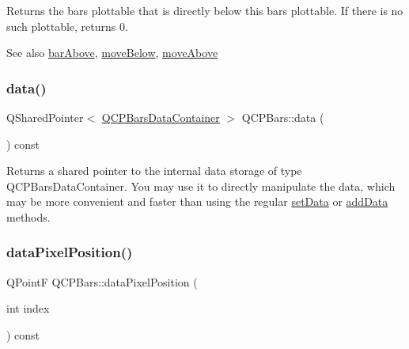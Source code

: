 Returns the bars plottable that is directly below this bars plottable. If there is no such plottable, returns 0.

\begin{DoxySeeAlso}{See also}
\hyperlink{class_q_c_p_bars_ab97f2acd9f6cb40d2cc3c33d278f0e78}{bar\+Above}, \hyperlink{class_q_c_p_bars_a69fc371346980f19177c3d1ecdad78ee}{move\+Below}, \hyperlink{class_q_c_p_bars_ac22e00a6a41509538c21b04f0a57318c}{move\+Above} 
\end{DoxySeeAlso}
\mbox{\label{class_q_c_p_bars_a7e373a534d82e18ed27b3fafd1f08fae}} 
\subsubsection{\texorpdfstring{data()}{data()}}
{\footnotesize\ttfamily Q\+Shared\+Pointer$<$ \hyperlink{class_q_c_p_data_container}{Q\+C\+P\+Bars\+Data\+Container} $>$ Q\+C\+P\+Bars\+::data (\begin{DoxyParamCaption}{ }\end{DoxyParamCaption}) const\hspace{0.3cm}{\ttfamily [inline]}}

Returns a shared pointer to the internal data storage of type Q\+C\+P\+Bars\+Data\+Container. You may use it to directly manipulate the data, which may be more convenient and faster than using the regular \hyperlink{class_q_c_p_bars_a6dc562ec7120a8521e1061f2134367e4}{set\+Data} or \hyperlink{class_q_c_p_bars_a323d6970d6d6e3166d89916a7f60f733}{add\+Data} methods. \mbox{\label{class_q_c_p_bars_a55cdaf565cd3384158d1f7f89533bc2d}} 
\subsubsection{\texorpdfstring{data\+Pixel\+Position()}{dataPixelPosition()}\hspace{0.1cm}{\footnotesize\ttfamily [1/2]}}
{\footnotesize\ttfamily Q\+PointF Q\+C\+P\+Bars\+::data\+Pixel\+Position (\begin{DoxyParamCaption}\item[{int}]{index }\end{DoxyParamCaption}) const\hspace{0.3cm}{\ttfamily [virtual]}}





